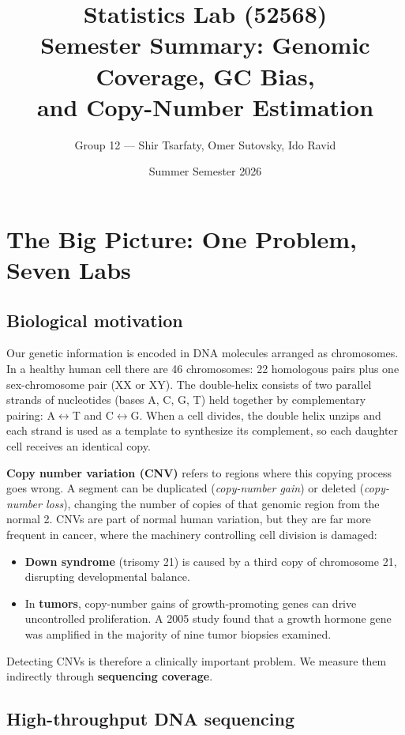 \documentclass[11pt]{article}
\title{\textbf{Statistics Lab (52568)\\[2pt]
\large Semester Summary: Genomic Coverage, GC Bias,\\
and Copy-Number Estimation}}
\author{Group 12 --- Shir Tsarfaty, Omer Sutovsky, Ido Ravid}
\date{Summer Semester 2026}
\begin{document}
\maketitle
\tableofcontents
\newpage

\section{The Big Picture: One Problem, Seven Labs}

\subsection{Biological motivation}

Our genetic information is encoded in DNA molecules arranged as chromosomes. In a
healthy human cell there are 46 chromosomes: 22 homologous pairs plus one sex-chromosome
pair (XX or XY). The double-helix consists of two parallel strands of nucleotides
(bases A, C, G, T) held together by complementary pairing: A$\leftrightarrow$T and
C$\leftrightarrow$G. When a cell divides, the double helix unzips and each strand
is used as a template to synthesize its complement, so each daughter cell receives an
identical copy.

\textbf{Copy number variation (CNV)} refers to regions where this copying process goes
wrong. A segment can be duplicated (\emph{copy-number gain}) or deleted
(\emph{copy-number loss}), changing the number of copies of that genomic region from
the normal 2. CNVs are part of normal human variation, but they are far more frequent
in cancer, where the machinery controlling cell division is damaged:
\begin{itemize}[leftmargin=*]
  \item \textbf{Down syndrome} (trisomy 21) is caused by a third copy of chromosome 21,
    disrupting developmental balance.
  \item In \textbf{tumors}, copy-number gains of growth-promoting genes can drive
    uncontrolled proliferation. A 2005 study found that a growth hormone gene was
    amplified in the majority of nine tumor biopsies examined.
\end{itemize}
Detecting CNVs is therefore a clinically important problem. We measure them
indirectly through \textbf{sequencing coverage}.

\subsection{High-throughput DNA sequencing}
\end{document}
